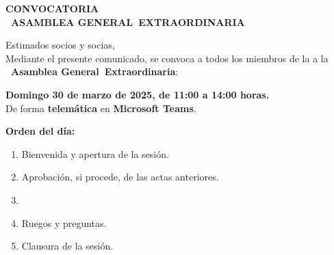 \documentclass[a4paper,12pt]{article}
\newcommand{\assemblyType}{Extraordinaria}
\newcommand{\assemblyDate}{Domingo 30 de marzo de 2025, de 11:00 a 14:00 horas.}
\newcommand{\assemblyPresence}{telemática}
\newcommand{\assemblyUbication}{Microsoft Teams}
\newcommand{\assemblyNumber}{1} %
\newcommand{\assemblyName}{\Romannum{\assemblyNumber}~Asamblea General~\assemblyType}
\newcommand{\subject}{CONVOCATORIA \\ \MakeUppercase{\assemblyName}}
\begin{document}
\begin{center}
    \large \textbf{\subject}
\end{center}

Estimados socios y socias, \\

Mediante el presente comunicado, se convoca a todos los miembros de la \textbf{\nombreAsociacion} a la \textbf{\assemblyName}:

\begin{center}
    \textbf{\assemblyDate}\\
    De forma \textbf{\assemblyPresence} en \textbf{\assemblyUbication}.
\end{center}

\textbf{Orden del día:}
\begin{enumerate}
    \item Bienvenida y apertura de la sesión.
    \item Aprobación, si procede, de las actas anteriores.
    \item
    \item Ruegos y preguntas.
    \item Clausura de la sesión.
\end{enumerate}

\firma
\end{document}
